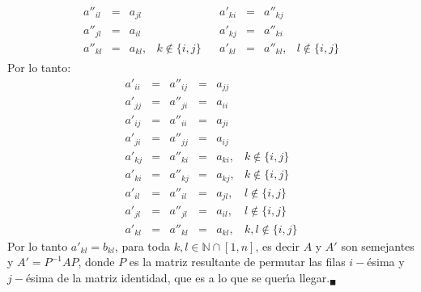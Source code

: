 \begin{solucion}
 \par 
 \begin{equation*}
  \begin{matrix}
   \begin{matrix}
    a''_{il} & = & a_{jl} \\
    a''_{jl} & = & a_{il} \\
    a''_{kl} & = & a_{kl}, & k\not\in\{i,j \}
   \end{matrix}
   & 
   \begin{matrix}
    a'_{ki} & = & a''_{kj} \\
    a'_{kj} & = & a''_{ki} \\
    a'_{kl} & = & a''_{kl}, & l\not\in\{ i, j\}
   \end{matrix}
  \end{matrix}
 \end{equation*}
 Por lo tanto:
 \begin{equation*}
  \begin{matrix}
   a'_{ii} & = & a''_{ij} & = & a_{jj} \\
   a'_{jj} & = & a''_{ji} & = & a_{ii} \\
   a'_{ij} & = & a''_{ii} & = & a_{ji} \\
   a'_{ji} & = & a''_{jj} & = & a_{ij} \\
   a'_{kj} & = & a''_{ki} & = & a_{ki}, & k \not\in\{ i,j \} \\
   a'_{ki} & = & a''_{kj} & = & a_{kj}, & k \not\in\{ i,j \} \\
   a'_{il} & = & a''_{il} & = & a_{jl}, & l \not\in\{ i,j \} \\
   a'_{jl} & = & a''_{jl} & = & a_{il}, & l \not\in\{ i,j \} \\
   a'_{kl} & = & a''_{kl} & = & a_{kl}, & k,l \not\in\{ i,j\}
  \end{matrix}
 \end{equation*}
 Por lo tanto $a'_{kl} = b_{kl}$, para toda $k,l\in\mathbb{N}\cap[1,n]$, es decir $A$ y $A'$ son semejantes y $A' = P^{-1}AP$, donde $P$ es la matriz resultante de permutar las filas $i-$\'esima y $j-$\'esima de la matriz identidad, que es a lo que se quer\'{\i}a llegar.${}_{\blacksquare}$
\end{solucion}

